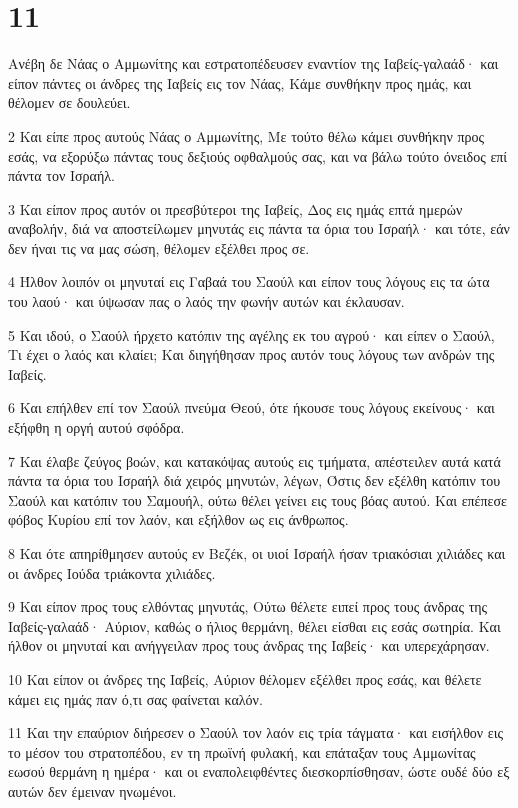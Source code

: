 \chapter{11}

\par Ανέβη δε Νάας ο Αμμωνίτης και εστρατοπέδευσεν εναντίον της Ιαβείς-γαλαάδ· και είπον πάντες οι άνδρες της Ιαβείς εις τον Νάας, Κάμε συνθήκην προς ημάς, και θέλομεν σε δουλεύει.
\par 2 Και είπε προς αυτούς Νάας ο Αμμωνίτης, Με τούτο θέλω κάμει συνθήκην προς εσάς, να εξορύξω πάντας τους δεξιούς οφθαλμούς σας, και να βάλω τούτο όνειδος επί πάντα τον Ισραήλ.
\par 3 Και είπον προς αυτόν οι πρεσβύτεροι της Ιαβείς, Δος εις ημάς επτά ημερών αναβολήν, διά να αποστείλωμεν μηνυτάς εις πάντα τα όρια του Ισραήλ· και τότε, εάν δεν ήναι τις να μας σώση, θέλομεν εξέλθει προς σε.
\par 4 Ήλθον λοιπόν οι μηνυταί εις Γαβαά του Σαούλ και είπον τους λόγους εις τα ώτα του λαού· και ύψωσαν πας ο λαός την φωνήν αυτών και έκλαυσαν.
\par 5 Και ιδού, ο Σαούλ ήρχετο κατόπιν της αγέλης εκ του αγρού· και είπεν ο Σαούλ, Τι έχει ο λαός και κλαίει; Και διηγήθησαν προς αυτόν τους λόγους των ανδρών της Ιαβείς.
\par 6 Και επήλθεν επί τον Σαούλ πνεύμα Θεού, ότε ήκουσε τους λόγους εκείνους· και εξήφθη η οργή αυτού σφόδρα.
\par 7 Και έλαβε ζεύγος βοών, και κατακόψας αυτούς εις τμήματα, απέστειλεν αυτά κατά πάντα τα όρια του Ισραήλ διά χειρός μηνυτών, λέγων, Όστις δεν εξέλθη κατόπιν του Σαούλ και κατόπιν του Σαμουήλ, ούτω θέλει γείνει εις τους βόας αυτού. Και επέπεσε φόβος Κυρίου επί τον λαόν, και εξήλθον ως εις άνθρωπος.
\par 8 Και ότε απηρίθμησεν αυτούς εν Βεζέκ, οι υιοί Ισραήλ ήσαν τριακόσιαι χιλιάδες και οι άνδρες Ιούδα τριάκοντα χιλιάδες.
\par 9 Και είπον προς τους ελθόντας μηνυτάς, Ούτω θέλετε ειπεί προς τους άνδρας της Ιαβείς-γαλαάδ· Αύριον, καθώς ο ήλιος θερμάνη, θέλει είσθαι εις εσάς σωτηρία. Και ήλθον οι μηνυταί και ανήγγειλαν προς τους άνδρας της Ιαβείς· και υπερεχάρησαν.
\par 10 Και είπον οι άνδρες της Ιαβείς, Αύριον θέλομεν εξέλθει προς εσάς, και θέλετε κάμει εις ημάς παν ό,τι σας φαίνεται καλόν.
\par 11 Και την επαύριον διήρεσεν ο Σαούλ τον λαόν εις τρία τάγματα· και εισήλθον εις το μέσον του στρατοπέδου, εν τη πρωϊνή φυλακή, και επάταξαν τους Αμμωνίτας εωσού θερμάνη η ημέρα· και οι εναπολειφθέντες διεσκορπίσθησαν, ώστε ουδέ δύο εξ αυτών δεν έμειναν ηνωμένοι.
